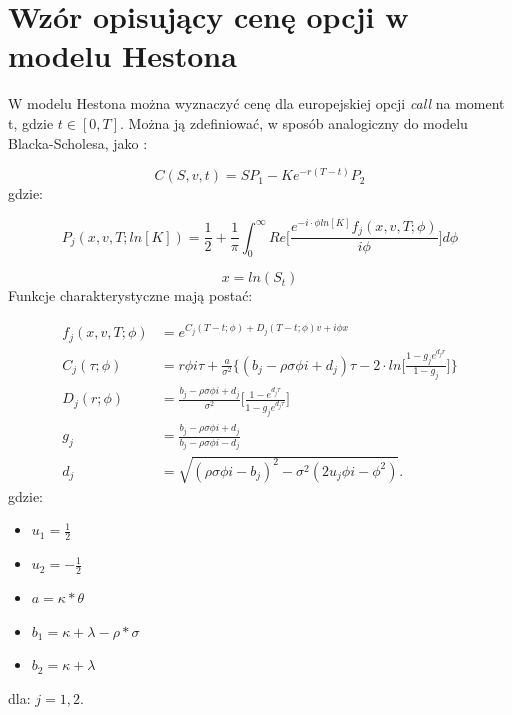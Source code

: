 \documentclass{pracamgr}
\begin{document}
\section{Wzór opisujący cenę opcji w modelu Hestona}

W modelu Hestona można wyznaczyć cenę dla europejskiej opcji \textit{call} na moment t, 
gdzie $t \in [0, T]$. Można ją zdefiniować, w sposób analogiczny do modelu Blacka-Scholesa, jako 
\cite{Heston}:

\begin{equation}
\label{eq:HestonCharacteristicFirst}
  C(S, v, t) = SP_1 -K e^{-r(T-t)} P_2
\end{equation}
gdzie:

\begin{equation}
\label{eq:HestonProb}
  P_j (x, v, T; ln[K]) = \frac{1}{2} + \frac{1}{\pi} \int_{0}^{\infty} Re \bigg[ \frac{e^{-i \cdot \phi ln[K]} f_j(x, v, T; \phi) }{i \phi} \bigg] d \phi 
\end{equation}

\begin{equation}
  x = ln(S_t)
\end{equation}
Funkcje charakterystyczne mają postać: 

\begin{equation}
\label{eq:HestonCharacteristic}
  \begin{aligned}
f_j(x, v, T; \phi) &= e^{C_j(T-t; \phi) + D_j(T-t; \phi)v + i \phi x} \\
C_j (\tau; \phi)     &= r \phi i \tau + \frac{a}{\sigma^2} \bigg\{ (b_j - \rho \sigma \phi i + d_j) \tau - 2 \cdot ln \bigg[ \frac{1 - g_j e^{d_j r}}{1-g_j} \bigg] \bigg\} \\
D_j (r; \phi)        &= \frac{b_j- \rho \sigma \phi i + d_j}{\sigma^2} \bigg[ \frac{1 - e^{d_j \tau}}{1 - g_j e^{d_j \tau}} \bigg]   \\
g_j                &= \frac{b_j - \rho \sigma \phi i + d_j}{b_j - \rho \sigma \phi i - d_j} \\
d_j                &= \sqrt{(\rho \sigma \phi i  - b_j)^2 - \sigma^2(2 u_j \phi  i  - \phi^2)}.
  \end{aligned}
\end{equation}
gdzie:
\begin{itemize}
  \item  $ u_1 = \frac{1}{2}$
  \item  $ u_2 = -\frac{1}{2}$
  \item  $ a = \kappa * \theta$
  \item  $ b_1 = \kappa + \lambda - \rho * \sigma$
  \item  $ b_2 = \kappa + \lambda$
\end{itemize}
dla: $j = 1,2$.
\end{document}

